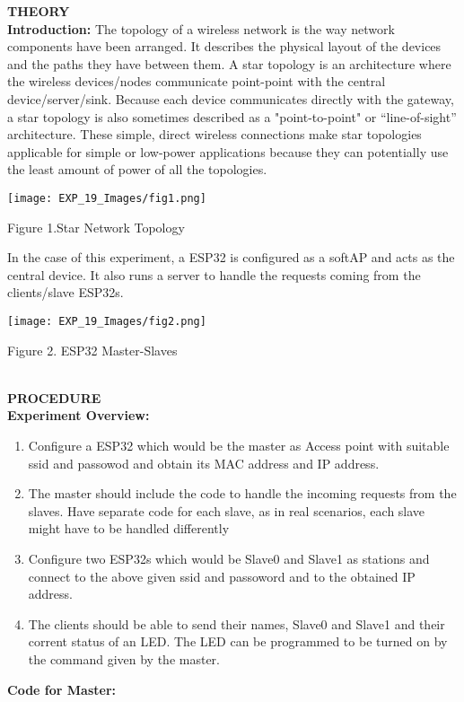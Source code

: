 \documentclass[12pt,a4paper]{article}
\begin{document}
\begin{justify}
\textbf{\large THEORY}\\[3pt]
\textbf{Introduction: }The topology of a wireless network is the way network components have been arranged. It describes the physical layout of the devices and the paths they have between them.  A star topology is an architecture where the wireless devices/nodes communicate point-point with the central device/server/sink. Because each device communicates directly with the gateway, a star topology is also sometimes described as a "point-to-point" or “line-of-sight” architecture. These simple, direct wireless connections make star topologies applicable for simple or low-power applications because they can potentially use the least amount of power of all the topologies.

\begin{center} 
\texttt{[image: EXP\_19\_Images/fig1.png]}
\end{center}
\begin{center} {Figure 1.Star Network Topology}\end{center}

\noindent In the case of this experiment, a ESP32 is configured as a softAP and acts as the central device. It also runs a server to handle the requests coming from the clients/slave ESP32s. 

\begin{center} 
\texttt{[image: EXP\_19\_Images/fig2.png]}
\end{center}
\begin{center} {Figure 2. ESP32 Master-Slaves}\end{center}\\[21pt]
\noindent \textbf{\large PROCEDURE}\\[3pt]
\textbf{Experiment Overview:}\\
\vspace{-6mm}
\begin{enumerate}
 \setlength\itemsep{-0.3em}
\item Configure a ESP32 which would be the master as Access point with suitable ssid and passowod and obtain its MAC address and IP address. 
\item The master should include the code to handle the incoming requests from the slaves. Have separate code for each slave, as in real scenarios, each slave might have to be handled differently
\item Configure two ESP32s which would be Slave0 and Slave1 as stations and connect to the above given ssid and passoword and to the obtained IP address.
\item The clients should be able to send their names, Slave0 and Slave1 and their corrent status of an LED. The LED can be programmed to be turned on by the command given by the master.
\end{enumerate}
\end{justify}
\vspace{20mm}
\hspace{1cm}\textbf{\large Code for Master:}\\[6pt]
\end{document}
